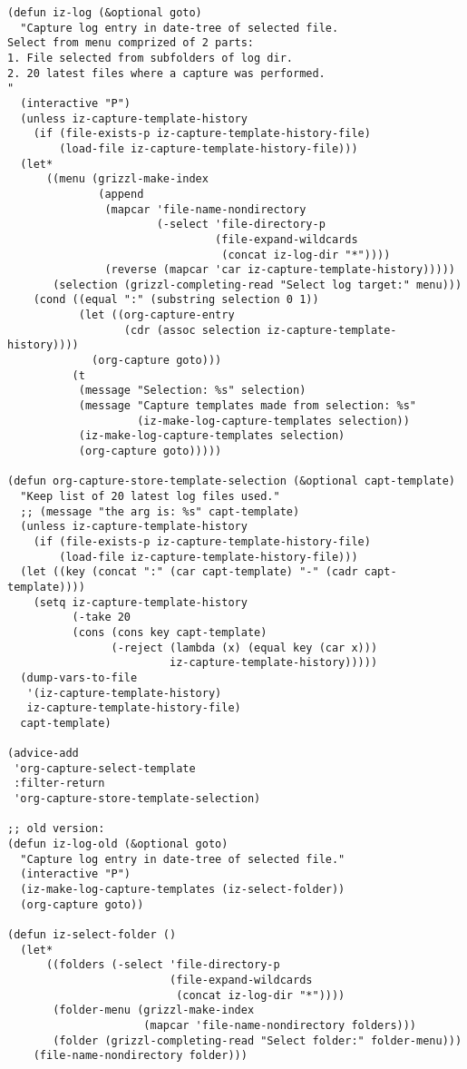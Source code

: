 \documentclass[nofonts]{tufte-handout}
\begin{document}
\begin{verbatim}
(defun iz-log (&optional goto)
  "Capture log entry in date-tree of selected file.
Select from menu comprized of 2 parts:
1. File selected from subfolders of log dir.
2. 20 latest files where a capture was performed.
"
  (interactive "P")
  (unless iz-capture-template-history
    (if (file-exists-p iz-capture-template-history-file)
        (load-file iz-capture-template-history-file)))
  (let*
      ((menu (grizzl-make-index
              (append
               (mapcar 'file-name-nondirectory
                       (-select 'file-directory-p
                                (file-expand-wildcards
                                 (concat iz-log-dir "*"))))
               (reverse (mapcar 'car iz-capture-template-history)))))
       (selection (grizzl-completing-read "Select log target:" menu)))
    (cond ((equal ":" (substring selection 0 1))
           (let ((org-capture-entry
                  (cdr (assoc selection iz-capture-template-history))))
             (org-capture goto)))
          (t
           (message "Selection: %s" selection)
           (message "Capture templates made from selection: %s"
                    (iz-make-log-capture-templates selection))
           (iz-make-log-capture-templates selection)
           (org-capture goto)))))

(defun org-capture-store-template-selection (&optional capt-template)
  "Keep list of 20 latest log files used."
  ;; (message "the arg is: %s" capt-template)
  (unless iz-capture-template-history
    (if (file-exists-p iz-capture-template-history-file)
        (load-file iz-capture-template-history-file)))
  (let ((key (concat ":" (car capt-template) "-" (cadr capt-template))))
    (setq iz-capture-template-history
          (-take 20
          (cons (cons key capt-template)
                (-reject (lambda (x) (equal key (car x)))
                         iz-capture-template-history)))))
  (dump-vars-to-file
   '(iz-capture-template-history)
   iz-capture-template-history-file)
  capt-template)

(advice-add
 'org-capture-select-template
 :filter-return
 'org-capture-store-template-selection)

;; old version:
(defun iz-log-old (&optional goto)
  "Capture log entry in date-tree of selected file."
  (interactive "P")
  (iz-make-log-capture-templates (iz-select-folder))
  (org-capture goto))

(defun iz-select-folder ()
  (let*
      ((folders (-select 'file-directory-p
                         (file-expand-wildcards
                          (concat iz-log-dir "*"))))
       (folder-menu (grizzl-make-index
                     (mapcar 'file-name-nondirectory folders)))
       (folder (grizzl-completing-read "Select folder:" folder-menu)))
    (file-name-nondirectory folder)))


\end{verbatim}
\end{document}
